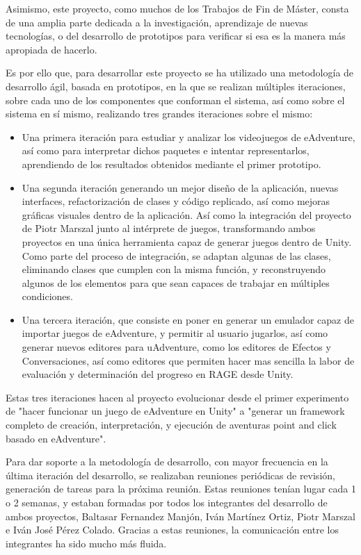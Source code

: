Asimismo, este proyecto, como muchos de los Trabajos de Fin de Máster, consta de una amplia parte dedicada a la investigación, aprendizaje de nuevas tecnologías, o del desarrollo de prototipos para verificar si esa es la manera más apropiada de hacerlo.

Es por ello que, para desarrollar este proyecto se ha utilizado una metodología de desarrollo ágil, basada en prototipos, en la que se realizan múltiples iteraciones, sobre cada uno de los componentes que conforman el sistema, así como sobre el sistema en sí mismo, realizando tres grandes iteraciones sobre el mismo: 

\begin{itemize}
	\item Una primera iteración para estudiar y analizar los videojuegos de eAdventure, así como para interpretar dichos paquetes e intentar representarlos, aprendiendo de los resultados obtenidos mediante el primer prototipo. 
	
	\item Una segunda iteración generando un mejor diseño de la aplicación, nuevas interfaces, refactorización de clases y código replicado, así como mejoras gráficas visuales dentro de la aplicación. Así como la integración del proyecto de Piotr Marszal junto al intérprete de juegos, transformando ambos proyectos en una única herramienta capaz de generar juegos dentro de Unity. Como parte del proceso de integración, se adaptan algunas de las clases, eliminando clases que cumplen con la misma función, y reconstruyendo algunos de los elementos para que sean capaces de trabajar en múltiples condiciones.
	
	\item Una tercera iteración, que consiste en poner en generar un emulador capaz de importar juegos de eAdventure, y permitir al usuario jugarlos, así como generar nuevos editores para uAdventure, como los editores de Efectos y Conversaciones, así como editores que permiten hacer mas sencilla la labor de evaluación y determinación del progreso en RAGE desde Unity.
\end{itemize}

Estas tres iteraciones hacen al proyecto evolucionar desde el primer experimento de "hacer funcionar un juego de eAdventure en Unity" a "generar un framework completo de creación, interpretación, y ejecución de aventuras point and click basado en eAdventure". 

Para dar soporte a la metodología de desarrollo, con mayor frecuencia en la última iteración del desarrollo, se realizaban reuniones periódicas de revisión, generación de tareas para la próxima reunión. Estas reuniones tenían lugar cada 1 o 2 semanas, y estaban formadas por todos los integrantes del desarrollo de ambos proyectos, Baltasar Fernandez Manjón, Iván Martínez Ortiz, Piotr Marszal e Iván José Pérez Colado. Gracias a estas reuniones, la comunicación entre los integrantes ha sido mucho más fluida.

